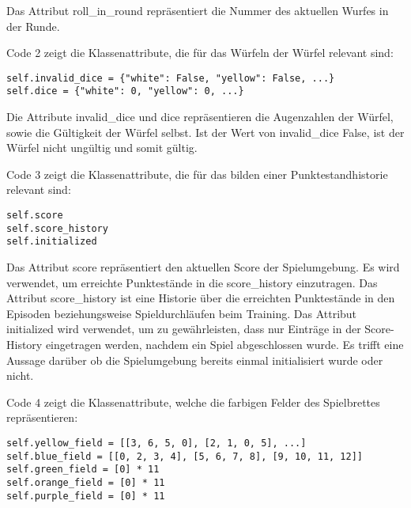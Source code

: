 Das Attribut roll\_in\_round repräsentiert die Nummer des aktuellen Wurfes in der Runde.\\

\begin{minipage}{\linewidth}
Code 2 zeigt die Klassenattribute, die für das Würfeln der Würfel relevant sind:
\vspace{0.5cm}
\begin{lstlisting}[caption={Klassenattribute für Würfel}, basicstyle=\ttfamily]
self.invalid_dice = {"white": False, "yellow": False, ...}
self.dice = {"white": 0, "yellow": 0, ...}
\end{lstlisting}
\end{minipage}

Die Attribute invalid\_dice und dice repräsentieren die Augenzahlen der Würfel, sowie die Gültigkeit der Würfel selbst. Ist der Wert von invalid\_dice False, ist der Würfel nicht ungültig und somit gültig.\\

\begin{minipage}{\linewidth}
Code 3 zeigt die Klassenattribute, die für das bilden einer Punktestandhistorie relevant sind:
\vspace{0.5cm}
\begin{lstlisting}[caption={Klassenattribute für die Nachvollziehbarkeit von Punkteständen}, basicstyle=\ttfamily]
self.score
self.score_history
self.initialized
\end{lstlisting}
\end{minipage}

Das Attribut score repräsentiert den aktuellen Score der Spielumgebung. Es wird verwendet, um erreichte Punktestände in die score\_history einzutragen. Das Attribut score\_history ist eine Historie über die erreichten Punktestände in den Episoden beziehungsweise Spieldurchläufen beim Training. Das Attribut initialized wird verwendet, um zu gewährleisten, dass nur Einträge in der Score-History eingetragen werden, nachdem ein Spiel abgeschlossen wurde. Es trifft eine Aussage darüber ob die Spielumgebung bereits einmal initialisiert wurde oder nicht.\\

\begin{minipage}{\linewidth}
Code 4 zeigt die Klassenattribute, welche die farbigen Felder des Spielbrettes repräsentieren:
\vspace{0.5cm}
\begin{lstlisting}[caption={Klassenattribute für die farbigen Felder des Spiels}, basicstyle=\ttfamily]
self.yellow_field = [[3, 6, 5, 0], [2, 1, 0, 5], ...]
self.blue_field = [[0, 2, 3, 4], [5, 6, 7, 8], [9, 10, 11, 12]]
self.green_field = [0] * 11
self.orange_field = [0] * 11
self.purple_field = [0] * 11
\end{lstlisting}
\end{minipage}

